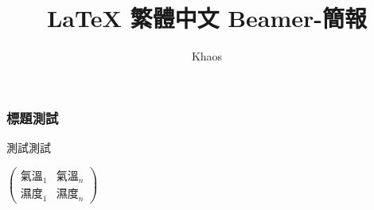 \documentclass[14pt]{ctexbeamer}
\begin{document}
	\author{Khaos}
	\title{\LaTeX{} 繁體中文 Beamer-簡報}
	\begin{frame}[plain]
		\maketitle
	\end{frame}
	
	\begin{frame}
		\frametitle{標題測試}
		測試{}測試\par
		
	
		$\begin{pmatrix} 
			\text{氣溫}_1 & \text{氣溫}_n \\
			\text{濕度}_1 & \text{濕度}_n 
		\end{pmatrix}$\par
	
	
	\end{frame}
\end{document}
